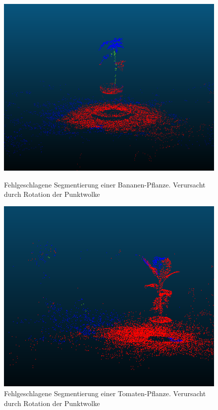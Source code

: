 \documentclass[12pt,titlepage, twoside]{article}
\begin{document}
\begin{figure}
    \centering
    \begin{minipage}{0.475\textwidth}
        \centering
        \includegraphics[width=1.0\textwidth]{./Images/RotationError1.png}
        \caption{Fehlgeschlagene Segmentierung einer Bananen-Pflanze. Verursacht durch Rotation der Punktwolke}
        \label{fig:rotation:error:1}
    \end{minipage}\hfill
    \begin{minipage}{0.475\textwidth}
        \centering
        \includegraphics[width=1.0\textwidth]{./Images/RotationError2.png}
        \caption{Fehlgeschlagene Segmentierung einer Tomaten-Pflanze. Verursacht durch Rotation der Punktwolke}
        \label{fig:rotation:error:2}
    \end{minipage}
\end{figure}
\end{document}
